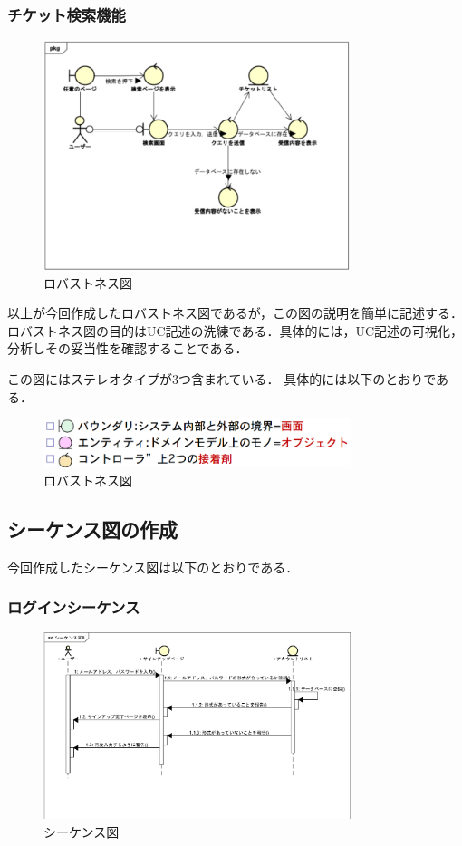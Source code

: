 \documentclass{ltjsarticle}
\begin{document}
\subsubsection{チケット検索機能}
\begin{figure}[H]
    \centering
    \includegraphics[width=0.8\textwidth]{src/Robustness2.png}
    \caption{ロバストネス図}
    \label{fig:robustness2}
\end{figure}

以上が今回作成したロバストネス図であるが，この図の説明を簡単に記述する．
ロバストネス図の目的はUC記述の洗練である．具体的には，UC記述の可視化，分析しその妥当性を確認することである．

この図にはステレオタイプが3つ含まれている．
具体的には以下のとおりである．
\begin{figure}[H]
    \centering
    \includegraphics[width=0.8\textwidth]{src/ExampleRobustness.png}
    \caption{ロバストネス図}
    \label{fig:robustness2}
\end{figure}

\subsection{シーケンス図の作成}
今回作成したシーケンス図は以下のとおりである．
\subsubsection{ログインシーケンス}
\begin{figure}[H]
    \centering
    \includegraphics[width=0.8\textwidth]{src/Sequence.png}
    \caption{シーケンス図}
    \label{fig:sequence}
\end{figure}
\end{document}
